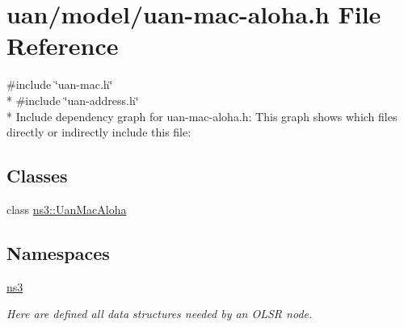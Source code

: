 \hypertarget{uan-mac-aloha_8h}{}\section{uan/model/uan-\/mac-\/aloha.h File Reference}
\label{uan-mac-aloha_8h}
{\ttfamily \#include \char`\"{}uan-\/mac.\+h\char`\"{}}\\*
{\ttfamily \#include \char`\"{}uan-\/address.\+h\char`\"{}}\\*
Include dependency graph for uan-\/mac-\/aloha.h\+:
This graph shows which files directly or indirectly include this file\+:
\subsection*{Classes}
\begin{DoxyCompactItemize}
\item 
class \hyperlink{classns3_1_1UanMacAloha}{ns3\+::\+Uan\+Mac\+Aloha}
\end{DoxyCompactItemize}
\subsection*{Namespaces}
\begin{DoxyCompactItemize}
\item 
 \hyperlink{namespacens3}{ns3}
\begin{DoxyCompactList}\small\item\em Here are defined all data structures needed by an O\+L\+SR node. \end{DoxyCompactList}\end{DoxyCompactItemize}
